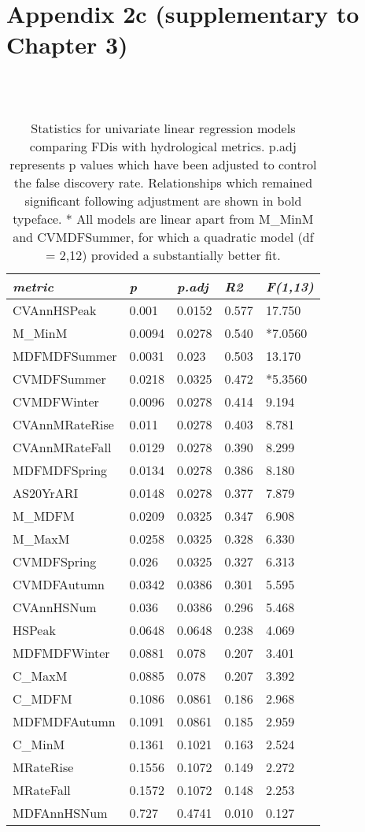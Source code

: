 \chapter[Appendix 2c (supplementary to Chapter 3)]{Appendix 2c (supplementary to Chapter 3)}

\begin{table}[ht]
\tiny
\centering
\caption[Statistics for univariate linear regression models.]{\small{Statistics for univariate linear regression models comparing FDis with hydrological metrics. p.adj represents p values which have been adjusted to control the false discovery rate. Relationships which remained significant following adjustment are shown in bold typeface. * All models are linear apart from M\_MinM and CVMDFSummer, for which a quadratic model (df = 2,12) provided a substantially better fit.}} \\
\label{Ch3sup4_T1} \\
{\tabulinesep=1.2mm
\begin{tabu} to 
\hline
\textit{metric} & \textit{p} & \textit{p.adj} & \textit{R2} & \textit{F(1,13)} \\
\hline
CVAnnHSPeak & 0.001 & 0.0152 & 0.577 & 17.750 \\
M\_MinM & 0.0094 & 0.0278 & 0.540 & *7.0560 \\
MDFMDFSummer & 0.0031 & 0.023 & 0.503 & 13.170 \\
CVMDFSummer & 0.0218 & 0.0325 & 0.472 & *5.3560 \\
CVMDFWinter & 0.0096 & 0.0278 & 0.414 & 9.194 \\
CVAnnMRateRise & 0.011 & 0.0278 & 0.403 & 8.781 \\
CVAnnMRateFall & 0.0129 & 0.0278 & 0.390 & 8.299 \\
MDFMDFSpring & 0.0134 & 0.0278 & 0.386 & 8.180 \\
AS20YrARI & 0.0148 & 0.0278 & 0.377 & 7.879 \\
M\_MDFM & 0.0209 & 0.0325 & 0.347 & 6.908 \\
M\_MaxM & 0.0258 & 0.0325 & 0.328 & 6.330 \\
CVMDFSpring & 0.026 & 0.0325 & 0.327 & 6.313 \\
CVMDFAutumn & 0.0342 & 0.0386 & 0.301 & 5.595 \\
CVAnnHSNum & 0.036 & 0.0386 & 0.296 & 5.468 \\
HSPeak & 0.0648 & 0.0648 & 0.238 & 4.069 \\
MDFMDFWinter & 0.0881 & 0.078 & 0.207 & 3.401 \\
C\_MaxM & 0.0885 & 0.078 & 0.207 & 3.392 \\
C\_MDFM & 0.1086 & 0.0861 & 0.186 & 2.968 \\
MDFMDFAutumn & 0.1091 & 0.0861 & 0.185 & 2.959 \\
C\_MinM & 0.1361 & 0.1021 & 0.163 & 2.524 \\
MRateRise & 0.1556 & 0.1072 & 0.149 & 2.272 \\
MRateFall & 0.1572 & 0.1072 & 0.148 & 2.253 \\
MDFAnnHSNum & 0.727 & 0.4741 & 0.010 & 0.127 \\
\hline
\end{tabu}}
\end{table}

\clearpage

